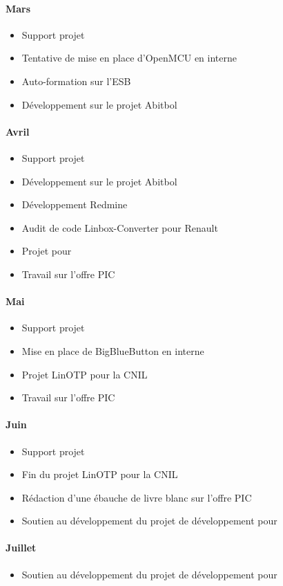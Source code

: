 \paragraph{Mars}
\begin{itemize}
	\item Support projet
	\item Tentative de mise en place d'OpenMCU en interne
	\item Auto-formation sur l'ESB \apetals{}
	\item Développement sur le projet Abitbol
\end{itemize}

\paragraph{Avril}
\begin{itemize}
	\item Support projet
	\item Développement sur le projet Abitbol
	\item Développement Redmine
	\item Audit de code Linbox-Converter pour Renault
	\item Projet \acentreon{} pour \adacast{}
	\item Travail sur l'offre PIC
\end{itemize}

\paragraph{Mai}
\begin{itemize}
	\item Support projet
	\item Mise en place de BigBlueButton en interne
	\item Projet LinOTP pour la CNIL
	\item Travail sur l'offre PIC
\end{itemize}

\paragraph{Juin}
\begin{itemize}
	\item Support projet
	\item Fin du projet LinOTP pour la CNIL
	\item Rédaction d'une ébauche de livre blanc sur l'offre PIC
	\item Soutien au développement du projet de développement pour \abt{}
\end{itemize}

\paragraph{Juillet}
\begin{itemize}
	\item Soutien au développement du projet de développement pour \abt{}
\end{itemize}

